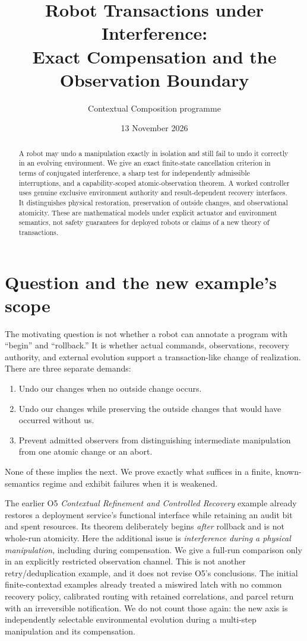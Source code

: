 \documentclass[11pt]{article}
\title{Robot Transactions under Interference:\\Exact Compensation and the Observation Boundary}
\author{Contextual Composition programme}\date{13 November 2026}
\begin{document}
\maketitle
\begin{abstract}
A robot may undo a manipulation exactly in isolation and still fail to undo it correctly in an evolving environment. We give an exact finite-state cancellation criterion in terms of conjugated interference, a sharp test for independently admissible interruptions, and a capability-scoped atomic-observation theorem. A worked controller uses genuine exclusive environment authority and result-dependent recovery interfaces. It distinguishes physical restoration, preservation of outside changes, and observational atomicity. These are mathematical models under explicit actuator and environment semantics, not safety guarantees for deployed robots or claims of a new theory of transactions.
\end{abstract}

\section{Question and the new example's scope}
The motivating question is not whether a robot can annotate a program with ``begin'' and ``rollback.'' It is whether actual commands, observations, recovery authority, and external evolution support a transaction-like change of realization. There are three separate demands:
\begin{enumerate}
\item Undo our changes when no outside change occurs.
\item Undo our changes while preserving the outside changes that would have occurred without us.
\item Prevent admitted observers from distinguishing intermediate manipulation from one atomic change or an abort.
\end{enumerate}
None of these implies the next. We prove exactly what suffices in a finite, known-semantics regime and exhibit failures when it is weakened.

The earlier O5 \emph{Contextual Refinement and Controlled Recovery} example already restores a deployment service's functional interface while retaining an audit bit and spent resources. Its theorem deliberately begins \emph{after} rollback and is not whole-run atomicity. Here the additional issue is \emph{interference during a physical manipulation}, including during compensation. We give a full-run comparison only in an explicitly restricted observation channel. This is not another retry/deduplication example, and it does not revise O5's conclusions. The initial finite-contextad examples already treated a miswired latch with no common recovery policy, calibrated routing with retained correlations, and parcel return with an irreversible notification. We do not count those again: the new axis is independently selectable environmental evolution during a multi-step manipulation and its compensation.
\end{document}
